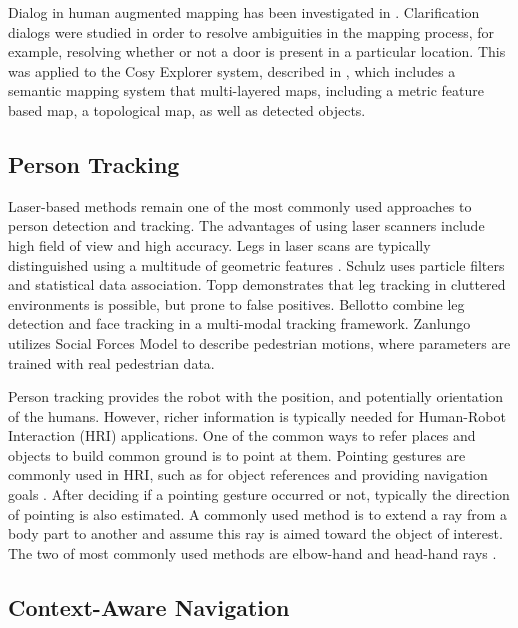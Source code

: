 \documentclass{tADR2e}
\begin{document}
Dialog in human augmented mapping has been investigated in \cite{kruijff2006clarification}. 
Clarification dialogs were studied in order to resolve ambiguities in the mapping process,
for example, resolving whether or not a door is present in a particular location. This was applied to the Cosy Explorer system, described in \cite{zender2007integrated}, 
which includes a semantic mapping system that multi-layered maps, including a metric feature based
map, a topological map, as well as detected objects.

\subsection{Person Tracking}
\label{sec:rel_person_tracking}

Laser-based methods remain one of the most commonly used approaches to person detection and tracking. 
The advantages of using laser scanners include high field of view and high accuracy. Legs in laser scans are typically distinguished using a multitude of geometric features \cite{arras2007using}. 
Schulz \cite{schulz2001tracking} uses particle filters and statistical data association.
Topp \cite{topp2005tracking} demonstrates that leg tracking in cluttered
environments is possible, but prone to false positives. Bellotto \cite{bellotto2009multisensor} combine leg detection 
and face tracking in a multi-modal tracking framework. Zanlungo \cite{zanlungo2011social} utilizes Social Forces Model to describe pedestrian motions, where parameters are trained with real pedestrian data. 

Person tracking provides the robot with the position, and potentially orientation of the humans.
However, richer information is typically needed for Human-Robot Interaction (HRI) applications. 
One of the common ways to refer places and objects to build common ground is to point at them. 
Pointing gestures are commonly used in HRI, such as for object references \cite{schmidt2008interacting} and providing navigation goals \cite{van2011real}. After deciding if a pointing gesture occurred or not, typically the direction of pointing
is also estimated. A commonly used method is to extend a ray from a body part to another and assume this ray is aimed toward the object of interest. The two of most commonly used methods are elbow-hand \cite{brooks2006working} and head-hand rays \cite{schmidt2008interacting}.

\subsection{Context-Aware Navigation}
\label{sec:rel_context_aware_navigation}
\end{document}
